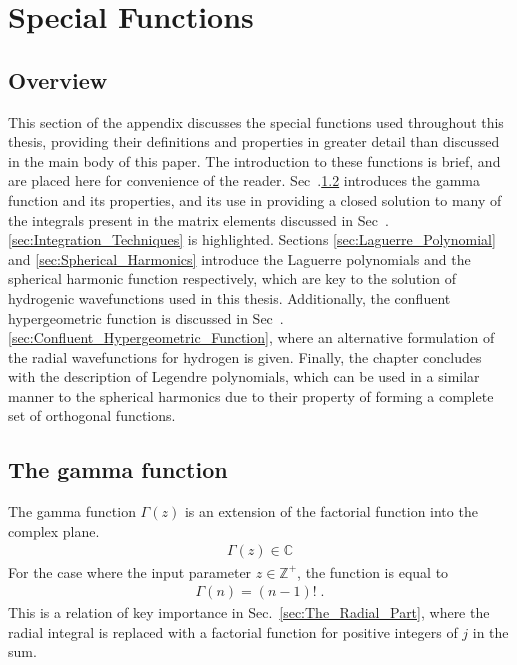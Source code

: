 \chapter{Special Functions}
    \section{Overview}
        This section of the appendix discusses the special functions used throughout this thesis, providing their definitions and properties in greater detail than discussed in the main body of this paper. The introduction to these functions is brief, and are placed here for convenience of the reader. Sec~.\ref{sec:Gamma_Function} introduces the gamma function and its properties, and its use in providing a closed solution to many of the integrals present in the matrix elements discussed in Sec~.\ref{sec:Integration_Techniques} is highlighted. Sections \ref{sec:Laguerre_Polynomial} and \ref{sec:Spherical_Harmonics} introduce the Laguerre polynomials and the spherical harmonic function respectively, which are key to the solution of hydrogenic wavefunctions used in this thesis. Additionally, the confluent hypergeometric function is discussed in Sec~.\ref{sec:Confluent_Hypergeometric_Function}, where an alternative formulation of the radial wavefunctions for hydrogen is given. Finally, the chapter concludes with the description of Legendre polynomials, which can be used in a similar manner to the spherical harmonics due to their property of forming a complete set of orthogonal functions.
    \section{The gamma function} \label{sec:Gamma_Function}
        The gamma function $\Gamma(z)$ is an extension of the factorial function into the complex plane. 
        \begin{align}
            \Gamma(z) \in \mathbb{C} 
        \end{align}
        For the case where the input parameter $z \in \mathbb{Z}^+$, the function is equal to \cite{Arfken_Weber_Arfken_Weber_2008}
        \begin{align}
            \Gamma(n) = (n - 1)!\;.
        \end{align}
        \noindent This is a relation of key importance in Sec.~\ref{sec:The_Radial_Part}, where the radial integral is replaced with a factorial function for positive integers of $j$ in the sum.\\

